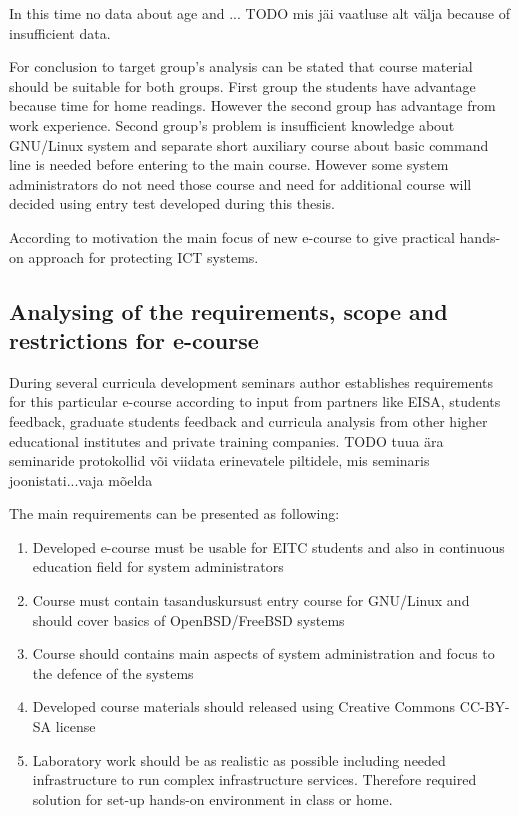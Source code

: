 In this time no data about age and ... {\color{red} TODO mis jäi vaatluse alt välja} because of insufficient data. 



For conclusion to target group's analysis can be stated that course material should be suitable for both groups. First group the students have advantage because time for home readings. However the second group has advantage from work experience. Second group's problem is insufficient knowledge about GNU/Linux system and separate short auxiliary course about basic command line is needed before entering to the main course. However some system administrators do not need those course and need for additional course will decided using entry test developed during this thesis.

According to motivation the main focus of new e-course to give practical hands-on approach for protecting \gls{ICT} systems.

\subsection{Analysing of the requirements, scope and restrictions for e-course}
During several curricula development seminars author establishes requirements for this particular e-course according to input from partners like \gls{EISA}, students feedback, graduate students feedback and curricula analysis from other higher educational institutes and private training companies. {\color{red} TODO tuua ära seminaride protokollid või viidata erinevatele piltidele, mis seminaris joonistati...vaja mõelda}


The main requirements can be presented as following:

\begin{enumerate}[label=Requirement \arabic*.,leftmargin=*]
  \item Developed e-course must be usable for \gls{EITC} students and also in continuous education field for system administrators
  \item Course must contain {\color{red} tasanduskursust} entry course for GNU/Linux and should cover basics  of OpenBSD/FreeBSD systems
  \item Course should contains main aspects of system administration and focus to the defence of the systems
  \item Developed course materials should released using Creative Commons \gls{CC-BY-SA} license
  \item Laboratory work should be as realistic as possible including needed infrastructure to run complex infrastructure services. Therefore required solution for set-up hands-on environment in class or home.
\end{enumerate}



